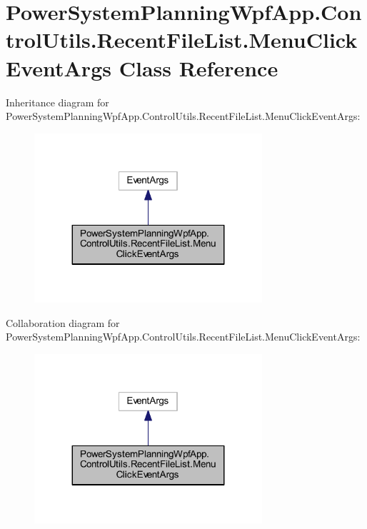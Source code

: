 \hypertarget{class_power_system_planning_wpf_app_1_1_control_utils_1_1_recent_file_list_1_1_menu_click_event_args}{}\section{Power\+System\+Planning\+Wpf\+App.\+Control\+Utils.\+Recent\+File\+List.\+Menu\+Click\+Event\+Args Class Reference}
\label{class_power_system_planning_wpf_app_1_1_control_utils_1_1_recent_file_list_1_1_menu_click_event_args}


Inheritance diagram for Power\+System\+Planning\+Wpf\+App.\+Control\+Utils.\+Recent\+File\+List.\+Menu\+Click\+Event\+Args\+:\nopagebreak
\begin{figure}[H]
\begin{center}
\leavevmode
\includegraphics[width=239pt]{class_power_system_planning_wpf_app_1_1_control_utils_1_1_recent_file_list_1_1_menu_click_event_args__inherit__graph}
\end{center}
\end{figure}


Collaboration diagram for Power\+System\+Planning\+Wpf\+App.\+Control\+Utils.\+Recent\+File\+List.\+Menu\+Click\+Event\+Args\+:\nopagebreak
\begin{figure}[H]
\begin{center}
\leavevmode
\includegraphics[width=239pt]{class_power_system_planning_wpf_app_1_1_control_utils_1_1_recent_file_list_1_1_menu_click_event_args__coll__graph}
\end{center}
\end{figure}
